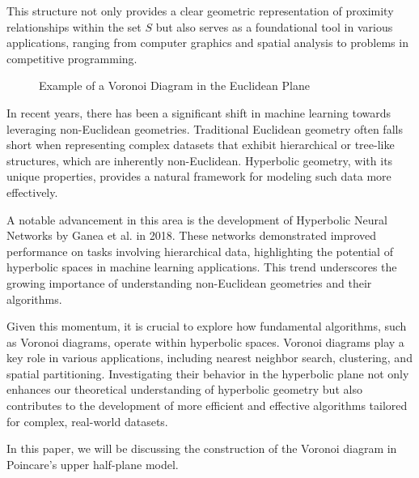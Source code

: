 \documentclass[minted, draw]{hebdomon}
\begin{document}
This structure not only provides a clear geometric representation of proximity relationships within the set \( S \) but also serves as a foundational tool in various applications, ranging from computer graphics and spatial analysis to problems in competitive programming. 

\begin{figure}
	\centering
        \caption{Example of a Voronoi Diagram in the Euclidean Plane}
        \label{fig:voronoi}
\end{figure}
%

In recent years, there has been a significant shift in machine learning towards leveraging non-Euclidean geometries. Traditional Euclidean geometry often falls short when representing complex datasets that exhibit hierarchical or tree-like structures, which are inherently non-Euclidean. Hyperbolic geometry, with its unique properties, provides a natural framework for modeling such data more effectively.

A notable advancement in this area is the development of Hyperbolic Neural Networks by Ganea et al. in 2018. These networks demonstrated improved performance on tasks involving hierarchical data, highlighting the potential of hyperbolic spaces in machine learning applications. This trend underscores the growing importance of understanding non-Euclidean geometries and their algorithms.

Given this momentum, it is crucial to explore how fundamental algorithms, such as Voronoi diagrams, operate within hyperbolic spaces. Voronoi diagrams play a key role in various applications, including nearest neighbor search, clustering, and spatial partitioning. Investigating their behavior in the hyperbolic plane not only enhances our theoretical understanding of hyperbolic geometry but also contributes to the development of more efficient and effective algorithms tailored for complex, real-world datasets.


In this paper, we will be discussing the construction of the Voronoi diagram in Poincare's upper half-plane model.








\end{document}
